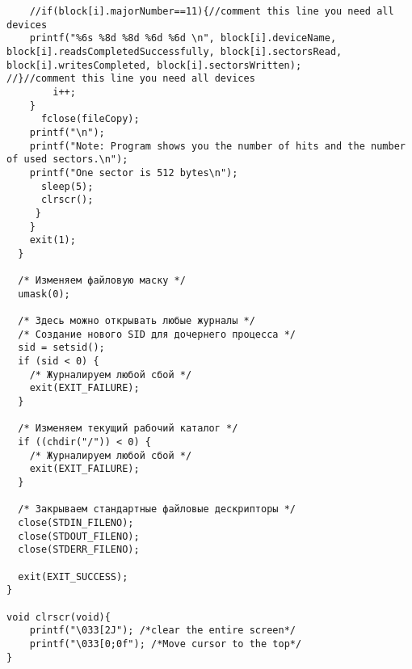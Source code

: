 \documentclass[a4paper]{article}
\begin{document}
\begin{verbatim}
	//if(block[i].majorNumber==11){//comment this line you need all devices
	printf("%6s %8d %8d %6d %6d \n", block[i].deviceName, block[i].readsCompletedSuccessfully, block[i].sectorsRead, block[i].writesCompleted, block[i].sectorsWritten);
//}//comment this line you need all devices
		i++;
	}
      fclose(fileCopy);
	printf("\n");
	printf("Note: Program shows you the number of hits and the number of used sectors.\n");
	printf("One sector is 512 bytes\n");
      sleep(5);
      clrscr();
     }
    }
    exit(1);
  }

  /* Изменяем файловую маску */
  umask(0);

  /* Здесь можно открывать любые журналы */       
  /* Создание нового SID для дочернего процесса */
  sid = setsid();
  if (sid < 0) {
    /* Журналируем любой сбой */
    exit(EXIT_FAILURE);
  }

  /* Изменяем текущий рабочий каталог */
  if ((chdir("/")) < 0) {
    /* Журналируем любой сбой */
    exit(EXIT_FAILURE);
  }

  /* Закрываем стандартные файловые дескрипторы */
  close(STDIN_FILENO);
  close(STDOUT_FILENO);
  close(STDERR_FILENO);

  exit(EXIT_SUCCESS);
}

void clrscr(void){
	printf("\033[2J"); /*clear the entire screen*/
	printf("\033[0;0f"); /*Move cursor to the top*/
}
\end{verbatim}
\end{document}
